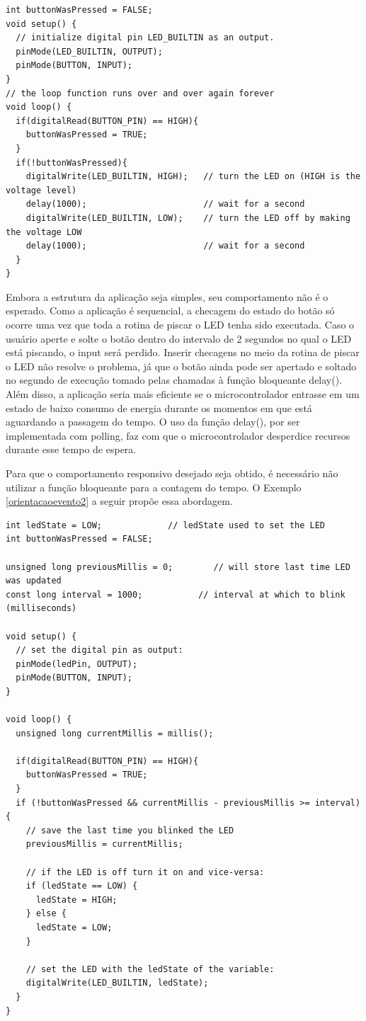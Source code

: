 \documentclass[11pt]{article}
\begin{document}
\begin{lstlisting}[style=CStyle,label=orientacaoevento1,caption=Aplicação bloqueante]
int buttonWasPressed = FALSE;
void setup() {
  // initialize digital pin LED_BUILTIN as an output.
  pinMode(LED_BUILTIN, OUTPUT);
  pinMode(BUTTON, INPUT);
}
// the loop function runs over and over again forever
void loop() {
  if(digitalRead(BUTTON_PIN) == HIGH){
    buttonWasPressed = TRUE;
  }
  if(!buttonWasPressed){ 
    digitalWrite(LED_BUILTIN, HIGH);   // turn the LED on (HIGH is the voltage level)
    delay(1000);                       // wait for a second
    digitalWrite(LED_BUILTIN, LOW);    // turn the LED off by making the voltage LOW
    delay(1000);                       // wait for a second
  }
}
\end{lstlisting}
\par Embora a estrutura da aplicação seja simples, seu comportamento não é o esperado. Como a aplicação é sequencial, a checagem do estado do botão só ocorre uma vez que toda a rotina de piscar o LED tenha sido executada. Caso o usuário aperte e solte o botão dentro do intervalo de 2 segundos no qual o LED está piscando, o input será perdido. Inserir checagens no meio da rotina de piscar o LED não resolve o problema, já que o botão ainda pode ser apertado e soltado no segundo de execução tomado pelas chamadas à função bloqueante delay(). Além disso, a aplicação seria mais eficiente se o microcontrolador entrasse em um estado de baixo consumo de energia durante os momentos em que está aguardando a passagem do tempo. O uso da função delay(), por ser implementada com polling, faz com que o microcontrolador desperdice recursos durante esse tempo de espera.
\par Para que o comportamento responsivo desejado seja obtido, é necessário não utilizar a função bloqueante para a contagem do tempo. O Exemplo \ref{orientacaoevento2} a seguir propõe essa abordagem.
\begin{lstlisting}[style=CStyle,label=orientacaoevento2,caption=Aplicação não bloqueante]
int ledState = LOW;             // ledState used to set the LED
int buttonWasPressed = FALSE;

unsigned long previousMillis = 0;        // will store last time LED was updated
const long interval = 1000;           // interval at which to blink (milliseconds)

void setup() {
  // set the digital pin as output:
  pinMode(ledPin, OUTPUT);
  pinMode(BUTTON, INPUT);
}

void loop() {
  unsigned long currentMillis = millis();

  if(digitalRead(BUTTON_PIN) == HIGH){
    buttonWasPressed = TRUE;
  }
  if (!buttonWasPressed && currentMillis - previousMillis >= interval) {
    // save the last time you blinked the LED
    previousMillis = currentMillis;

    // if the LED is off turn it on and vice-versa:
    if (ledState == LOW) {
      ledState = HIGH;
    } else {
      ledState = LOW;
    }

    // set the LED with the ledState of the variable:
    digitalWrite(LED_BUILTIN, ledState);
  }
}
\end{lstlisting}
\end{document}
